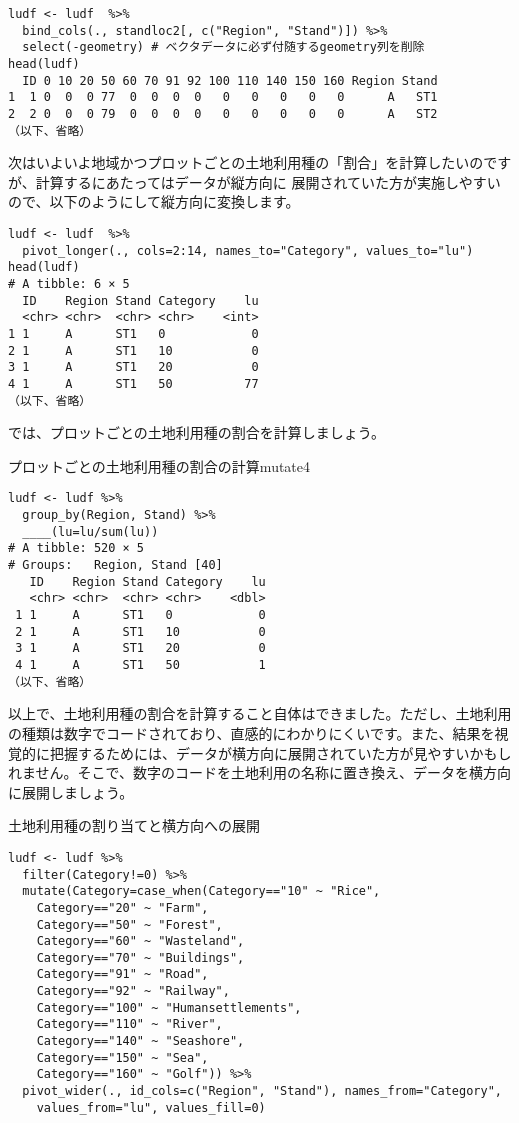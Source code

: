 \begin{verbatim}
ludf <- ludf  %>%
  bind_cols(., standloc2[, c("Region", "Stand")]) %>%
  select(-geometry) # ベクタデータに必ず付随するgeometry列を削除
head(ludf)
  ID 0 10 20 50 60 70 91 92 100 110 140 150 160 Region Stand
1  1 0  0  0 77  0  0  0  0   0   0   0   0   0      A   ST1
2  2 0  0  0 79  0  0  0  0   0   0   0   0   0      A   ST2
（以下、省略）
\end{verbatim}

次はいよいよ地域かつプロットごとの土地利用種の「割合」を計算したいのですが、計算するにあたってはデータが縦方向に
展開されていた方が実施しやすいので、以下のようにして縦方向に変換します。

\begin{verbatim}
ludf <- ludf  %>%
  pivot_longer(., cols=2:14, names_to="Category", values_to="lu")
head(ludf)
# A tibble: 6 × 5
  ID    Region Stand Category    lu
  <chr> <chr>  <chr> <chr>    <int>
1 1     A      ST1   0            0
2 1     A      ST1   10           0
3 1     A      ST1   20           0
4 1     A      ST1   50          77
（以下、省略）
\end{verbatim}

では、プロットごとの土地利用種の割合を計算しましょう。

\begin{exercise}{プロットごとの土地利用種の割合の計算}{mutate4}
\begin{verbatim}
ludf <- ludf %>%
  group_by(Region, Stand) %>%
  ____(lu=lu/sum(lu))
# A tibble: 520 × 5
# Groups:   Region, Stand [40]
   ID    Region Stand Category    lu
   <chr> <chr>  <chr> <chr>    <dbl>
 1 1     A      ST1   0            0
 2 1     A      ST1   10           0
 3 1     A      ST1   20           0
 4 1     A      ST1   50           1
（以下、省略）
\end{verbatim}
\end{exercise}
以上で、土地利用種の割合を計算すること自体はできました。ただし、土地利用の種類は数字でコードされており、直感的にわかりにくいです。また、結果を視覚的に把握するためには、データが横方向に展開されていた方が見やすいかもしれません。そこで、数字のコードを土地利用の名称に置き換え、データを横方向に展開しましょう。

\begin{itembox}[l]{土地利用種の割り当てと横方向への展開}
\begin{verbatim}
ludf <- ludf %>%
  filter(Category!=0) %>%
  mutate(Category=case_when(Category=="10" ~ "Rice",
    Category=="20" ~ "Farm",
    Category=="50" ~ "Forest",
    Category=="60" ~ "Wasteland",
    Category=="70" ~ "Buildings",
    Category=="91" ~ "Road",
    Category=="92" ~ "Railway",
    Category=="100" ~ "Humansettlements",
    Category=="110" ~ "River",
    Category=="140" ~ "Seashore",
    Category=="150" ~ "Sea",
    Category=="160" ~ "Golf")) %>%
  pivot_wider(., id_cols=c("Region", "Stand"), names_from="Category",
    values_from="lu", values_fill=0)
\end{verbatim}
\end{itembox}

